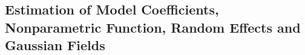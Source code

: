 \documentclass[12pt, notitlepage]{article}
\begin{document}
\subsection{Estimation of Model Coefficients, Nonparametric Function, Random Effects and Gaussian Fields} \label{estimation}

\end{document}
